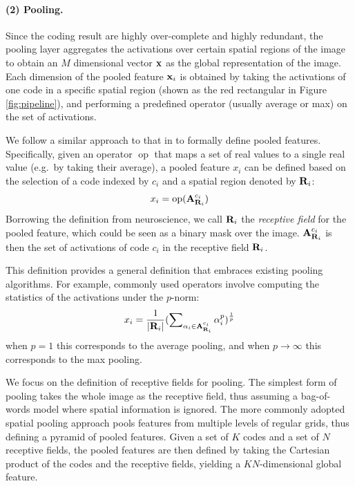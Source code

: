 \paragraph{(2) Pooling.} Since the coding result are highly over-complete and highly redundant, the pooling layer aggregates the activations over certain spatial regions of the image to obtain an $M$ dimensional vector $\mathbf{x}$ as the global representation of the image. Each dimension of the pooled feature $\mathbf{x}_i$ is obtained by taking the activations of one code in a specific spatial region (shown as the red rectangular in Figure \ref{fig:pipeline}), and performing a predefined operator (usually average or max) on the set of activations. 

We follow a similar approach to that in \cite{Boureau:2011tz} to formally define pooled features. Specifically, given an operator $\operatorname{op}$ that maps a set of real values to a single real value (e.g.\ by taking their average), a pooled feature $x_i$ can be defined based on the selection of a code indexed by $c_i$ and a spatial region denoted by $\mathbf{R}_{i}$:
\begin{equation}
  x_i = \operatorname{op} (\mathbf{A}^{c_i}_{\mathbf{R}_{i}})
\end{equation}
Borrowing the definition from neuroscience, we call $\mathbf{R}_i$ the \emph{receptive field} for the pooled feature, which could be seen as a binary mask over the image. $\mathbf{A}^{c_i}_{\mathbf{R}_{i}}$ is then the set of activations of code $c_i$ in the receptive field $\mathbf{R}_i$.

This definition provides a general definition that embraces existing pooling algorithms. For example, commonly used operators involve computing the statistics of the activations under the $p$-norm:
\begin{equation}
  x_i = \frac{1}{|\mathbf{R}_{i}|}(\sum\nolimits_{\alpha_i \in \mathbf{A}^{c_i}_{\mathbf{R}_{i}}} \alpha_i^{p})^{\frac{1}{p}}
\end{equation}
when $p=1$ this corresponds to the average pooling, and when $p\rightarrow \infty$ this corresponds to the max pooling.

We focus on the definition of receptive fields for pooling. The simplest form of pooling takes the whole image as the receptive field, thus assuming a bag-of-words model where spatial information is ignored. The more commonly adopted spatial pooling approach \cite{lazebnik2006beyond,Yang:2009vb} pools features from multiple levels of regular grids, thus defining a pyramid of pooled features. Given a set of $K$ codes and a set of $N$ receptive fields, the pooled features are then defined by taking the Cartesian product of the codes and the receptive fields, yielding a $KN$-dimensional global feature.

